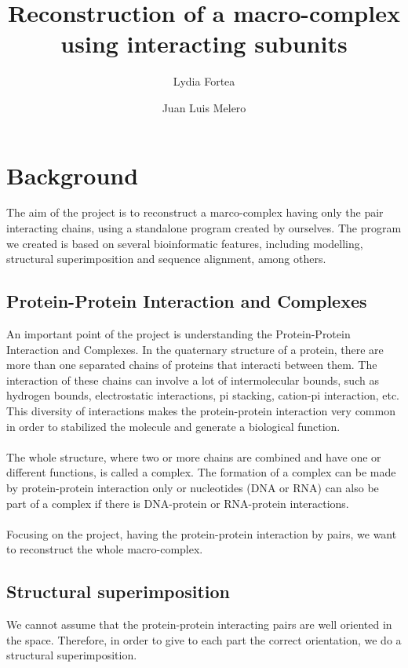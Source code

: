 \documentclass[a4paper,12pt]{report}
\title{Reconstruction of a macro-complex using interacting subunits}
\author{Lydia Fortea \and Juan Luis Melero}
\date{}
\begin{document}
\maketitle
\tableofcontents{}

\chapter{Background}

The aim of the project is to reconstruct a marco-complex having only the pair interacting chains, using a standalone program created by ourselves.
The program we created is based on several bioinformatic features, including modelling, structural superimposition and sequence alignment, among others.

\section{Protein-Protein Interaction and Complexes}

An important point of the project is understanding the Protein-Protein Interaction and Complexes. In the quaternary structure of a protein, there are more than one separated chains of proteins that interacti between them.
The interaction of these chains can involve a lot of intermolecular bounds, such as hydrogen bounds, electrostatic interactions, pi stacking, cation-pi interaction, etc. This diversity of interactions makes the protein-protein interaction
very common in order to stabilized the molecule and generate a biological function.\\\\

The whole structure, where two or more chains are combined and have one or different functions, is called a complex. The formation of a complex can be made by protein-protein interaction only or nucleotides (DNA or RNA) can also be part of a complex if there is DNA-protein or RNA-protein interactions.\\\\

Focusing on the project, having the protein-protein interaction by pairs, we want to reconstruct the whole macro-complex.

\section{Structural superimposition}

We cannot assume that the protein-protein interacting pairs are well oriented in the space. Therefore, in order to give to each part the correct orientation, we do a structural superimposition. 
\end{document}
